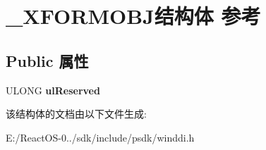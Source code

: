 \hypertarget{struct___x_f_o_r_m_o_b_j}{}\section{\+\_\+\+X\+F\+O\+R\+M\+O\+B\+J结构体 参考}
\label{struct___x_f_o_r_m_o_b_j}
\subsection*{Public 属性}
\begin{DoxyCompactItemize}
\item 
\mbox{\label{struct___x_f_o_r_m_o_b_j_a311bc037827a1b3207fe066f9c777419}} 
U\+L\+O\+NG {\bfseries ul\+Reserved}
\end{DoxyCompactItemize}


该结构体的文档由以下文件生成\+:\begin{DoxyCompactItemize}
\item 
E\+:/\+React\+O\+S-\/0../sdk/include/psdk/winddi.\+h\end{DoxyCompactItemize}
